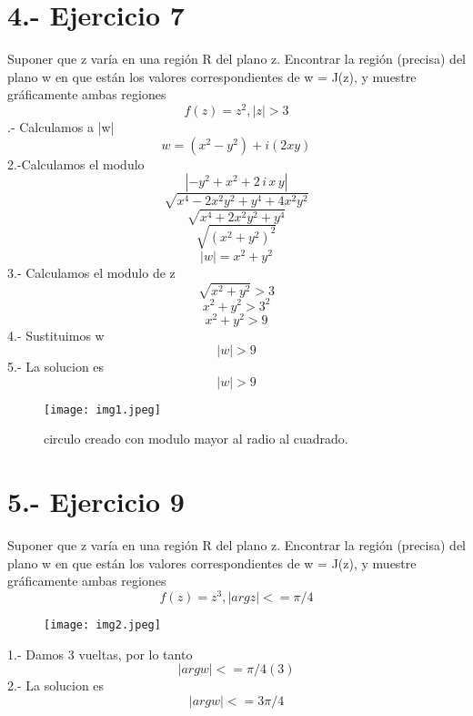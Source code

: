 \documentclass{article}
\begin{document}
\section*{4.- Ejercicio 7 }
\newline
Suponer que z varía en una región R del plano z. Encontrar la región (precisa) del plano w en
que están los valores correspondientes de w = J(z), y muestre gráficamente ambas regiones
\[
f(z)=z^2, |z|>3
\]
.- Calculamos a |w|
\[
w= (x^2-y^2)+i(2xy)
\]
2.-Calculamos el modulo
\[
\left|-y^{2}+x^{2}+2\,i\,x\,y\right|
\]
\[
\sqrt{x^4-2x^2y^2+y^4+4x^2y^2}
\]
\[
\sqrt{x^4+2x^2y^2+y^4}
\]
\[
\sqrt{(x^2+y^2)^2}
\]
\[
|w|=x^2+y^2
\]
3.- Calculamos el modulo de z
\[
\sqrt{x^2+y^2}>3
\]
\[
x^2+y^2>3^2
\]
\[
x^2+y^2>9
\]
4.- Sustituimos w
\[
|w|>9
\]
5.- La solucion es 
\[
|w|>9
\]
\begin{figure}
    \centering
    \texttt{[image: img1.jpeg]} %
    \caption{circulo creado con modulo mayor al radio al cuadrado.}
    \label{fig:mi_imagen}
\end{figure}

\section*{5.- Ejercicio 9 }
\newline
Suponer que z varía en una región R del plano z. Encontrar la región (precisa) del plano w en
que están los valores correspondientes de w = J(z), y muestre gráficamente ambas regiones
\[
f(z)=z^3, |argz|<=  \pi/4
\]
\newline
\begin{figure}
    \centering
    \texttt{[image: img2.jpeg]} %
    \label{fig:mi_imagen}
\end{figure}
1.- Damos 3 vueltas, por lo tanto 
\[
|argw|<=\pi/4 (3)
\]
2.- La solucion es 
\[
|argw|<= 3\pi / 4
\]
\end{document}
